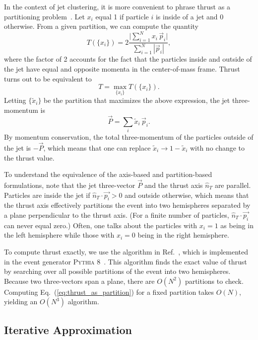 \documentclass[aps,prd,twocolumn,superscriptaddress,preprintnumbers,nofootinbib,longbibliography,floatfix]{revtex4-1}
\DeclareRobustCommand{\Eq}[1]{Eq.~(\ref{eq:#1})}
\DeclareRobustCommand{\Ref}[1]{Ref.~\cite{#1}}
\begin{document}
In the context of jet clustering, it is more convenient to phrase thrust as a partitioning problem~\cite{Yamamoto:1984fd}.
%
Let $x_i$ equal 1 if particle $i$ is inside of a jet and 0 otherwise.
%
From a given partition, we can compute the quantity
%
\begin{equation}
\label{eq:thrust_as_partition}
T(\{x_i\}) = 2 \frac{\Big| \sum_{i = 1}^N x_i \, \vec{p}_{i} \Big|}{\sum_{i = 1}^N |\vec{p}_{i}|},
\end{equation}
%
where the factor of 2 accounts for the fact that the particles inside and outside of the jet have equal and opposite momenta in the center-of-mass frame.
%
Thrust turns out to be equivalent to 
%
\begin{equation}
T = \max_{\{x_i\}} T(\{x_i\}).
\end{equation}
%
Letting $\{\tilde{x}_i\}$ be the partition that maximizes the above expression, the jet three-momentum is
%
\begin{equation}
\vec{P} = \sum_i \tilde{x}_i \, \vec{p}_{i}.
\end{equation}
%
By momentum conservation, the total three-momentum of the particles outside of the jet is $-\vec{P}$, which means that one can replace $\tilde{x}_i \to 1 - \tilde{x}_i$ with no change to the thrust value.


To understand the equivalence of the axis-based and partition-based formulations, note that the jet three-vector $\vec{P}$ and the thrust axis $\hat{n}_T$ are parallel.
%
Particles are inside the jet if $\hat{n}_T \cdot \vec{p_{i}} > 0$ and outside otherwise, which means that the thrust axis effectively partitions the event into two hemispheres separated by a plane perpendicular to the thrust axis.
%
(For a finite number of particles, $\hat{n}_T \cdot \vec{p_{i}}$ can never equal zero.)
%
Often, one talks about the particles with $x_i = 1$ as being in the left hemisphere while those with $x_i = 0$ being in the right hemisphere.


To compute thrust exactly, we use the algorithm in \Ref{YAMAMOTO1983597}, which is implemented in the event generator \textsc{Pythia} 8~\cite{Sj_strand_2008}.
%
This algorithm finds the exact value of thrust by searching over all possible partitions of the event into two hemispheres.
%
Because two three-vectors span a plane, there are $O(N^2)$ partitions to check.
%
Computing \Eq{thrust_as_partition} for a fixed partition takes $O(N)$, yielding an $O(N^3)$ algorithm.


\subsection{Iterative Approximation}
\label{sec:iterative}
\end{document}
